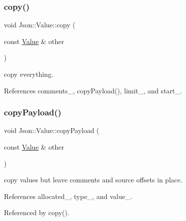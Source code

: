 \mbox{\label{classJson_1_1Value_a1b2c6379664d91b9f1bcd4d1853e5970_a1b2c6379664d91b9f1bcd4d1853e5970}} 
\subsubsection{\texorpdfstring{copy()}{copy()}}
{\footnotesize\ttfamily void Json\+::\+Value\+::copy (\begin{DoxyParamCaption}\item[{const \hyperlink{classJson_1_1Value}{Value} \&}]{other }\end{DoxyParamCaption})}



copy everything. 



References comments\+\_\+, copy\+Payload(), limit\+\_\+, and start\+\_\+.

\mbox{\label{classJson_1_1Value_ab504d299cfaa440392037fa8a3c54064_ab504d299cfaa440392037fa8a3c54064}} 
\subsubsection{\texorpdfstring{copy\+Payload()}{copyPayload()}}
{\footnotesize\ttfamily void Json\+::\+Value\+::copy\+Payload (\begin{DoxyParamCaption}\item[{const \hyperlink{classJson_1_1Value}{Value} \&}]{other }\end{DoxyParamCaption})}



copy values but leave comments and source offsets in place. 



References allocated\+\_\+, type\+\_\+, and value\+\_\+.



Referenced by copy().

\mbox{\label{classJson_1_1Value_afeb7ff596a0929d90c5f2f3cffb413ed_afeb7ff596a0929d90c5f2f3cffb413ed}} 
